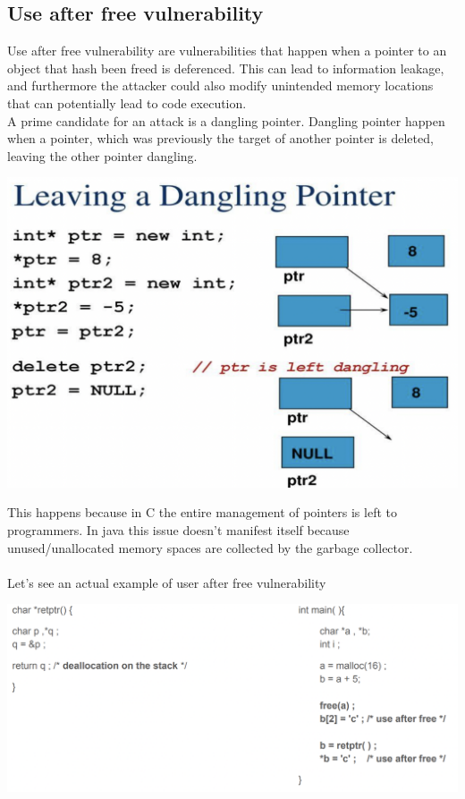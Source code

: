 \documentclass[11pt, oneside]{article}   	%
\begin{document}
\subsection*{Use after free vulnerability}
Use after free vulnerability are vulnerabilities that happen when a  pointer to an object that hash been freed is deferenced. This can lead to information leakage, and furthermore the attacker could also modify unintended memory locations that can potentially lead to code execution.\\
A prime candidate for an attack is a dangling pointer. Dangling pointer happen when a pointer, which was previously the target of another pointer is deleted, leaving the other pointer dangling.\\
\begin{center}
\includegraphics[scale = 0.6]{dpointer}
\end{center}
This happens because in C the entire management of pointers is left to programmers. In java this issue doesn't manifest itself because unused/unallocated memory spaces are collected by the garbage collector.\\\\
Let's see an actual example of user after free vulnerability
\begin{center}
\includegraphics[scale = 0.6]{usafter}
\end{center}
\end{document}
